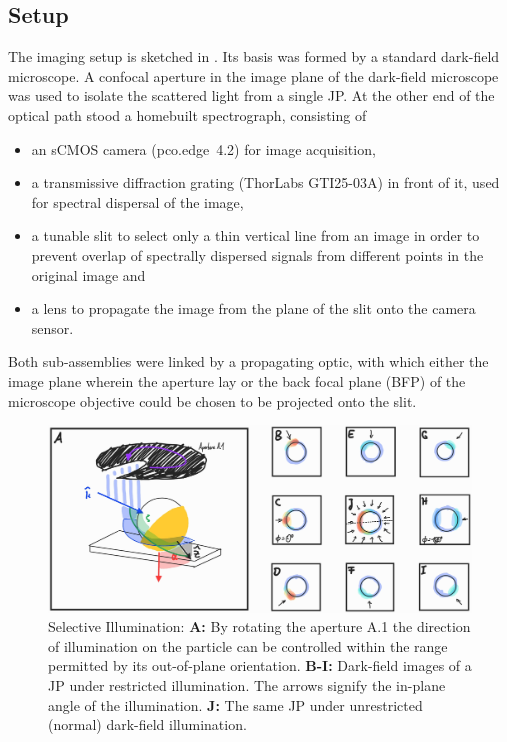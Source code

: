 \documentclass[10pt]{article}
\newcommand{\reffig}[2]{\mbox{\sffamily{Figure \ref{#1}#2}}}
\begin{document}
\begin{multicols}{2}
\subsection*{Setup}

The imaging setup is sketched in \reffig{fig:setup}{C}. 
Its basis was formed by a standard dark-field microscope. 
A confocal aperture in the image plane of the dark-field microscope was used to isolate the scattered light from a single JP. 
At the other end of the optical path stood a homebuilt spectrograph, consisting of 
\begin{itemize}
    \item an sCMOS camera \mbox{\sffamily(pco.edge 4.2)} for image acquisition, 
    \item a transmissive diffraction grating {\sffamily(ThorLabs GTI25-03A)} in front of it, used for spectral dispersal of the image,
    \item a tunable slit to select only a thin vertical line from an image in order to prevent overlap of spectrally dispersed signals from different points in the original image and
    \item a lens to propagate the image from the plane of the slit onto the camera sensor.  
\end{itemize}

Both sub-assemblies were linked by a propagating optic, with which either the image plane wherein the aperture lay or the back focal plane (BFP) of the microscope objective could be chosen to be projected onto the slit.

\begin{figure}[t!]
    \centering
    \includegraphics[width=\textwidth]{[fig] selective illumination}
    \caption{Selective Illumination:   
    {\sffamily\bfseries A:} By rotating the aperture A.1 the direction of illumination on the particle can be controlled within the range permitted by its out-of-plane orientation. 
    {\sffamily\bfseries B-I:} Dark-field images of a JP under restricted illumination. 
    The arrows signify the in-plane angle of the illumination.  
    {\sffamily\bfseries J:} The same JP under unrestricted (normal) dark-field illumination. 
    }
    \label{fig:selective-illumination}
\end{figure}


\end{multicols}
\end{document}
